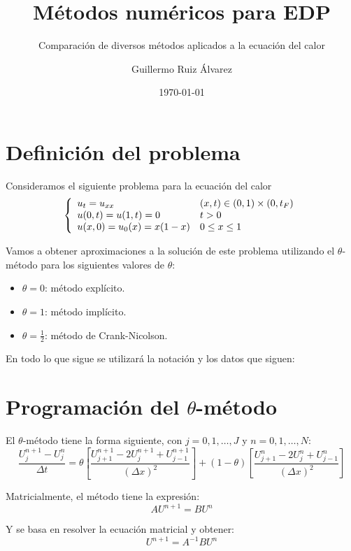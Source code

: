 \documentclass[spanish]{mathnotes}
\title{Métodos numéricos para EDP}
\subtitle{Comparación de diversos métodos aplicados a la ecuación del calor}
\author{Guillermo Ruiz Álvarez}
\date{\today}
\begin{document}
	\makepre
	
	\section{Definición del problema}
	Consideramos el siguiente problema para la ecuación del calor
	\begin{equation*}
	\left\{
		\begin{array}{l l}
			u_t = u_{xx} & (x,t)\in(0,1)\times (0,t_F)\\
			u(0,t) = u(1,t) = 0 & t>0\\
			u(x,0) = u_0(x) = x(1-x) & 0\le x\le 1
		\end{array}
	\right.
	\end{equation*}
	
	Vamos a obtener aproximaciones a la solución de este problema utilizando el $\theta$-método para los siguientes valores de $\theta$:
	\begin{itemize}
		\item $\theta = 0$: método explícito.
		\item $\theta = 1$: método implícito.
		\item $\theta = \frac{1}{2}$: método de Crank-Nicolson.
	\end{itemize}
	
	En todo lo que sigue se utilizará la notación y los datos que siguen:
	\begin{center}
			\hspace{1em}
			\hspace{1em}
	\end{center}
	
	\section{Programación del $\theta$-método}
	El $\theta$-método tiene la forma siguiente, con $j =  0,1, \hdots, J$ y $n=0,1,\hdots, N$: 
	$$\frac{U_j^{n+1}-U_j^n}{\Delta t} = 
	\theta \left[\frac{U_{j+1}^{n+1}-2U_{j}^{n+1}+U_{j-1}^{n+1}}{(\Delta x)^2}\right] +
	(1-\theta) \left[ \frac{U_{j+1}^n-2U_j^n+U_{j-1}^n}{(\Delta x)^2}\right]$$
	
	Matricialmente, el método tiene la expresión:
	$$AU^{n+1} = BU^n$$
	
	Y se basa en resolver la ecuación matricial y obtener:
	$$U^{n+1} = A^{-1} B U^n$$
	
\end{document}
